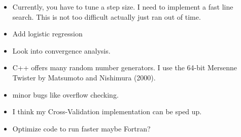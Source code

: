 \documentclass[10pt, reqno]{article}
\numberwithin{equation}{section}
\begin{document}
\begin{itemize}

\item Currently, you have to tune a step size. I need to implement a fast line search. This is not too difficult actually just ran out of time.

\item Add logistic regression

\item Look into convergence analysis.

\item C++ offers many random number generators. I use the 64-bit Mersenne Twister by Matsumoto and Nishimura (2000).

\item minor bugs like overflow checking.

\item I think my Cross-Validation implementation can be sped up.

\item Optimize code to run faster maybe Fortran?

\end{itemize}
\end{document}
